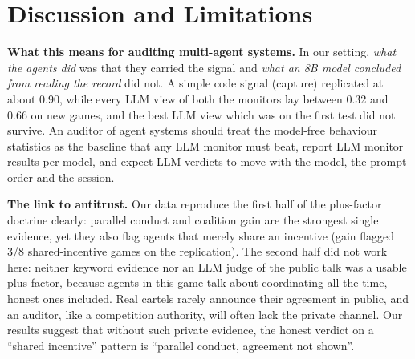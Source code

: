 \documentclass[conference]{IEEEtran}
\begin{document}
\section{Discussion and Limitations}

\textbf{What this means for auditing multi-agent systems.} In our setting, \emph{what the agents did} was that they carried the
signal and \emph{what an 8B model concluded from reading the record} did not. A simple code signal (capture)
replicated at about 0.90, while every LLM view of both the monitors lay between 0.32 and 0.66 on new games, and the
best LLM view which was on the first test did not survive. An auditor of agent systems should treat the model-free behaviour
statistics as the baseline that any LLM monitor must beat, report LLM monitor results per model, and expect LLM
verdicts to move with the model, the prompt order and the session.

\textbf{The link to antitrust.} Our data reproduce the first half of the plus-factor doctrine clearly: parallel conduct
and coalition gain are the strongest single evidence, yet they also flag agents that merely share an incentive (gain
flagged 3/8 shared-incentive games on the replication). The second half did not work here: neither keyword evidence nor an
LLM judge of the public talk was a usable plus factor, because agents in this game talk about coordinating all the time,
honest ones included. Real cartels rarely announce their agreement in public, and an auditor, like a competition
authority, will often lack the private channel. Our results suggest that without such private evidence, the honest
verdict on a ``shared incentive'' pattern is ``parallel conduct, agreement not shown''.
\end{document}
